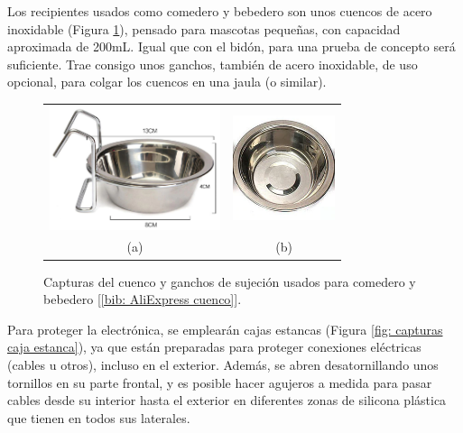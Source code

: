 \documentclass[12pt]{article}
\begin{document}
	\noindent Los recipientes usados como comedero y bebedero son unos cuencos de acero inoxidable (Figura \ref{fig: capturas bebedero}), pensado para mascotas pequeñas, con capacidad aproximada de 200mL. Igual que con el bidón, para una prueba de concepto será suficiente. Trae consigo unos ganchos, también de acero inoxidable, de uso opcional, para colgar los cuencos en una jaula (o similar).\\
	
	\begin{figure}[h]
		\begin{center}
			\begin{tabular}{cc}
				\includegraphics[width=50mm]{img/cuenco_1.png} &   \includegraphics[width=30mm]{img/cuenco_2.png} \\
				(a) & (b)  \\[6pt]
			\end{tabular}
			\caption{Capturas del cuenco y ganchos de sujeción usados para comedero y bebedero [\ref{bib: AliExpress cuenco}]. }
			\label{fig: capturas bebedero}
		\end{center}
	\end{figure}
	
	\noindent Para proteger la electrónica, se emplearán cajas estancas (Figura \ref{fig: capturas caja estanca}), ya que están preparadas para proteger conexiones eléctricas (cables u otros), incluso en el exterior. Además, se abren desatornillando unos tornillos en su parte frontal, y es posible hacer agujeros a medida  para pasar cables desde su interior hasta el exterior en diferentes zonas de silicona plástica que tienen en todos sus laterales. \\
	
\end{document}
